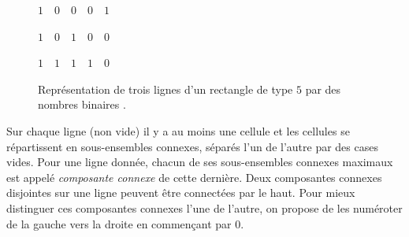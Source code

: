 \begin{figure}[!htb]
\begin{minipage}[c]{.96\linewidth}
 \centering
\begin{minipage}[c]{.26\linewidth}
        \centering
\begin{logicpuzzle}[rows=1,columns=5,color=cyan!100,width=750px,scale=0.5]
\end{logicpuzzle}
$1$\mbox{ }\mbox{ }$0$\mbox{ }\mbox{ }$0$\mbox{ }\mbox{ }$0$\mbox{ }\mbox{ }$1$\mbox{ }\mbox{ }\mbox{ }\mbox{ }\mbox{ }
\end{minipage}\hfill
\begin{minipage}[c]{.26\linewidth}
 \centering
\begin{logicpuzzle}[rows=1,columns=5,color=cyan!100,width=750px,scale=0.5]
\end{logicpuzzle}
$1$\mbox{ }\mbox{ }$0$\mbox{ }\mbox{ }$1$\mbox{ }\mbox{ }$0$\mbox{ }\mbox{ }$0$\mbox{ }\mbox{ }\mbox{ }\mbox{ }\mbox{ }
\end{minipage}\hfill
\begin{minipage}[c]{.26\linewidth}
 \centering
 \begin{logicpuzzle}[rows=1,columns=5,color=cyan!100,width=750px,scale=0.5]
\end{logicpuzzle}
$1$\mbox{ }\mbox{ }$1$\mbox{ }\mbox{ }$1$\mbox{ }\mbox{ }$1$\mbox{ }\mbox{ }$0$\mbox{ }\mbox{ }\mbox{ }\mbox{ }\mbox{ }
\end{minipage}
\end{minipage}
\caption{Représentation de trois lignes d'un rectangle de type  $5$ par des nombres binaires \label{Atfigb} .}
\end{figure}
Sur chaque ligne (non vide) il y a au moins une cellule et les  cellules se répartissent en sous-ensembles connexes, séparés  l'un de l'autre  par des cases vides. Pour une ligne donnée, chacun de ses sous-ensembles connexes maximaux est appelé \emph{composante connexe} de cette dernière. Deux composantes connexes disjointes sur une ligne peuvent être connectées par le haut. Pour mieux  distinguer ces composantes connexes l'une de l'autre, on propose de les numéroter de la gauche vers la droite en commençant par  $0$. 

